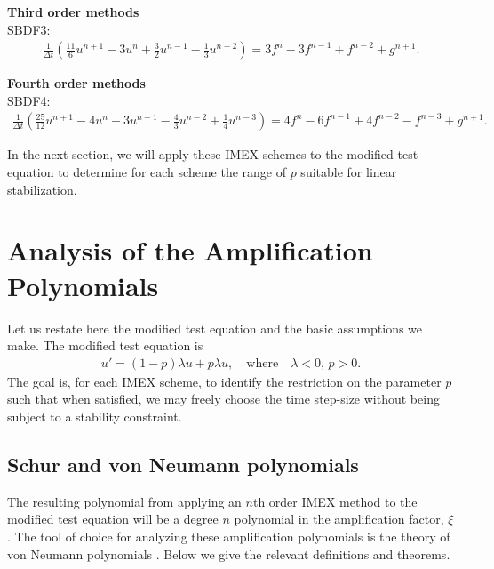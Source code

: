 \noindent
\textbf{Third order methods}\\
SBDF3:
\begin{align}
\frac{1}{\Delta t}\left(\frac{11}{6}u^{n+1} - 3u^n + \frac{3}{2}u^{n-1} - \frac{1}{3}u^{n-2} \right) 
= 3f^n - 3f^{n-1} + f^{n-2} + g^{n+1}.
\label{sbdf3}
\end{align}

\noindent
\textbf{Fourth order methods}\\
SBDF4:
\begin{align}
\frac{1}{\Delta t}\left(\frac{25}{12}u^{n+1} - 4u^n + 3u^{n-1} - \frac{4}{3}u^{n-2} + \frac{1}{4}u^{n-3} \right) 
= 4f^n - 6f^{n-1} + 4f^{n-2} -f^{n-3} + g^{n+1}.
\label{sbdf4}
\end{align}

In the next section, we will apply these IMEX schemes to the modified test equation to determine for each scheme the range of $p$ suitable for linear stabilization.

\section{Analysis of the Amplification Polynomials}
Let us restate here the modified test equation and the basic assumptions we make.
The modified test equation is 
\begin{align*}
        u' = (1-p)\lambda u + p\lambda u,
\quad\text{where}\quad \lambda < 0\text{, } p>0.
\label{mtee}
\end{align*}
The goal is, for each IMEX scheme, to identify the restriction on the parameter $p$ such that when satisfied, we may freely choose the time step-size without being subject to a stability constraint.

\subsection{Schur and von Neumann polynomials}
The resulting polynomial from applying an $n$th order IMEX method to the modified test equation will be a degree $n$ polynomial in the amplification factor, $\xi$. The tool of choice for analyzing these amplification polynomials is the theory of von Neumann polynomials \cite[Chapter 4]{strikwerda2004finite}. Below we give the relevant definitions and theorems.

